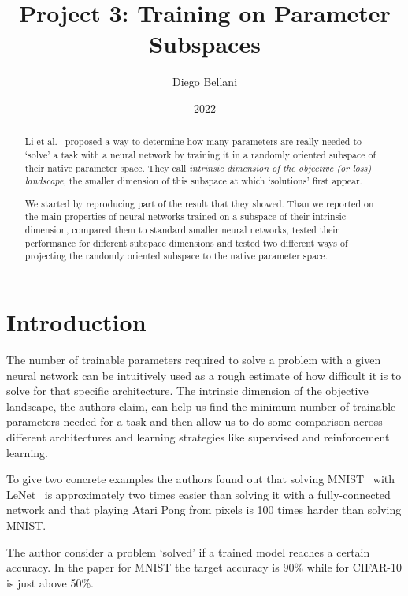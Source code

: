 \documentclass[twocolumn]{article}
\title{Project 3: Training on Parameter Subspaces}
\author{Diego Bellani}
\date{2022}
\begin{document}
\maketitle

\begin{abstract}
Li et al.~\cite{intr} proposed a way to determine how many parameters are really
needed to `solve' a task with a neural network by training it in a randomly
oriented subspace of their native parameter space. They call \emph{intrinsic
dimension of the objective (or loss) landscape}, the smaller dimension of this
subspace at which `solutions' first appear.

We started by reproducing part of the result that they showed. Than we reported
on the main properties of neural networks trained on a subspace of their
intrinsic dimension, compared them to standard smaller neural networks, tested
their performance for different subspace dimensions and tested two different
ways of projecting the randomly oriented subspace to the native parameter space.
\end{abstract}

\section{Introduction}
The number of trainable parameters required to solve a problem with a given
neural network can be intuitively used as a rough estimate of how difficult it
is to solve for that specific architecture. The intrinsic dimension of the
objective landscape, the authors claim, can help us find the minimum number of
trainable parameters needed for a task and then allow us to do some comparison
across different architectures and learning strategies like supervised and
reinforcement learning.

To give two concrete examples the authors found out that solving
MNIST~\cite{mnist} with LeNet~\cite{lenet} is approximately two times easier
than solving it with a fully-connected network and that playing Atari Pong from
pixels is 100 times harder than solving MNIST.

The author consider a problem `solved' if a trained model reaches a certain
accuracy. In the paper for MNIST the target accuracy is 90\% while for CIFAR-10
is just above 50\%.
\end{document}
